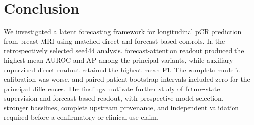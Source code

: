 \section{Conclusion}
We investigated a latent forecasting framework for longitudinal pCR prediction from breast MRI using matched direct and forecast-based controls. In the retrospectively selected seed44 analysis, forecast-attention readout produced the highest mean AUROC and AP among the principal variants, while auxiliary-supervised direct readout retained the highest mean F1. The complete model's calibration was worse, and paired patient-bootstrap intervals included zero for the principal differences. The findings motivate further study of future-state supervision and forecast-based readout, with prospective model selection, stronger baselines, complete upstream provenance, and independent validation required before a confirmatory or clinical-use claim.
